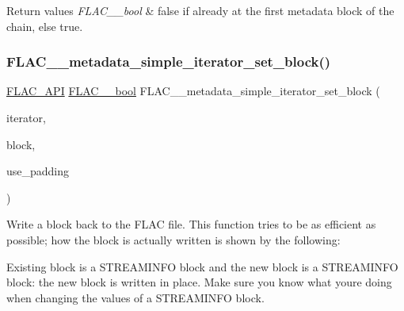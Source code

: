 \begin{DoxyRetVals}{Return values}
{\em F\+L\+A\+C\+\_\+\+\_\+bool} & {\ttfamily false} if already at the first metadata block of the chain, else {\ttfamily true}. \\
\hline
\end{DoxyRetVals}
\mbox{\label{group__flac__metadata__level1_ga7d1ceb2db292c968ae6ac18ecb15c356}} 
\subsubsection{\texorpdfstring{F\+L\+A\+C\+\_\+\+\_\+metadata\+\_\+simple\+\_\+iterator\+\_\+set\+\_\+block()}{FLAC\_\_metadata\_simple\_iterator\_set\_block()}}
{\footnotesize\ttfamily \hyperlink{group__flac__export_ga56ca07df8a23310707732b1c0007d6f5}{F\+L\+A\+C\+\_\+\+A\+PI} \hyperlink{ordinals_8h_a95103469f1cbd78b8cf250194985b34e}{F\+L\+A\+C\+\_\+\+\_\+bool} F\+L\+A\+C\+\_\+\+\_\+metadata\+\_\+simple\+\_\+iterator\+\_\+set\+\_\+block (\begin{DoxyParamCaption}\item[{\hyperlink{group__flac__metadata__level1_ga6accccddbb867dfc2eece9ee3ffecb3a}{F\+L\+A\+C\+\_\+\+\_\+\+Metadata\+\_\+\+Simple\+Iterator} $\ast$}]{iterator,  }\item[{\hyperlink{struct_f_l_a_c_____stream_metadata}{F\+L\+A\+C\+\_\+\+\_\+\+Stream\+Metadata} $\ast$}]{block,  }\item[{\hyperlink{ordinals_8h_a95103469f1cbd78b8cf250194985b34e}{F\+L\+A\+C\+\_\+\+\_\+bool}}]{use\+\_\+padding }\end{DoxyParamCaption})}

Write a block back to the F\+L\+AC file. This function tries to be as efficient as possible; how the block is actually written is shown by the following\+:

Existing block is a S\+T\+R\+E\+A\+M\+I\+N\+FO block and the new block is a S\+T\+R\+E\+A\+M\+I\+N\+FO block\+: the new block is written in place. Make sure you know what you\textquotesingle{}re doing when changing the values of a S\+T\+R\+E\+A\+M\+I\+N\+FO block.

